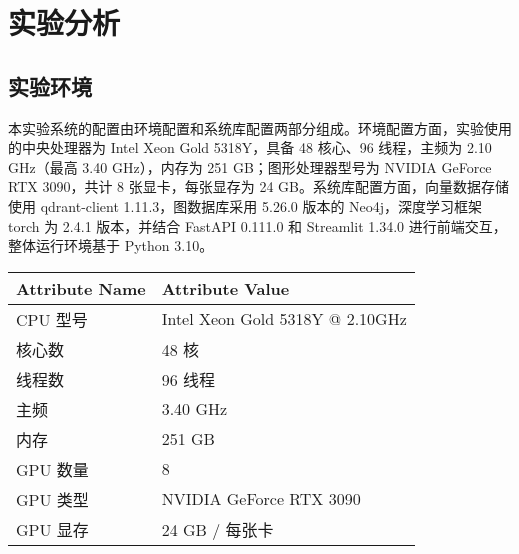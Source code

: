 \chapter{实验分析}

\section{实验环境}

本实验系统的配置由环境配置和系统库配置两部分组成。环境配置方面，实验使用的中央处理器为 Intel Xeon Gold 5318Y，具备 48 核心、96 线程，主频为 2.10 GHz（最高 3.40 GHz），内存为 251 GB；图形处理器型号为 NVIDIA GeForce RTX 3090，共计 8 张显卡，每张显存为 24 GB。系统库配置方面，向量数据存储使用 qdrant-client 1.11.3，图数据库采用 5.26.0 版本的 Neo4j，深度学习框架 torch 为 2.4.1 版本，并结合 FastAPI 0.111.0 和 Streamlit 1.34.0 进行前端交互，整体运行环境基于 Python 3.10。

\begin{table}[h]
  \centering
  \begin{tabular}{l|l}
  \toprule
  \textbf{Attribute Name} & \textbf{Attribute Value} \\ \midrule
  CPU 型号                & Intel Xeon Gold 5318Y @ 2.10GHz       \\
  核心数                  & 48 核                                  \\
  线程数                  & 96 线程                                \\
  主频                    & 3.40 GHz                              \\
  内存              & 251 GB                                        \\
  GPU 数量                & 8             \\
  GPU 类型 & NVIDIA GeForce RTX 3090 \\
  GPU 显存                & 24 GB / 每张卡                         \\
  \bottomrule
  \end{tabular}
  \label{tab:environment}
\end{table}

